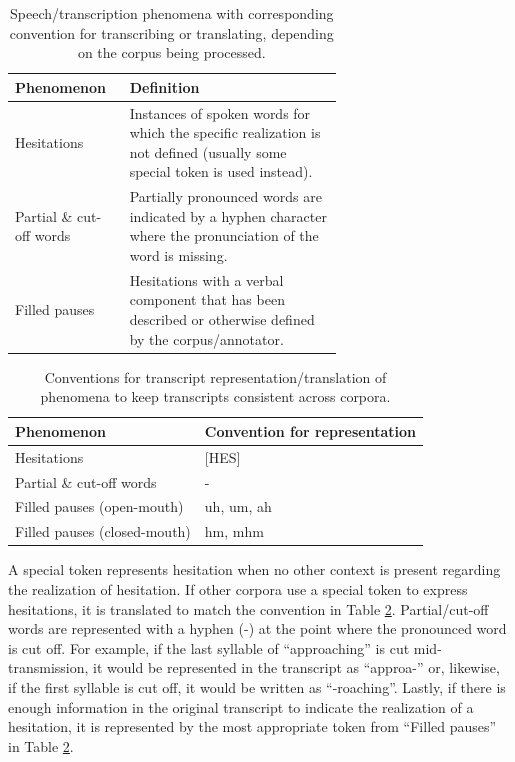 \documentclass[12pt]{article}
\begin{document}
\begin{table}[!t]
    \centering
    \begin{tabular}{l p{0.65\linewidth}}
        \toprule
        Phenomenon               & Definition                                                                                                                \\
        \midrule
        Hesitations              & Instances of spoken words for which the specific realization is not defined (usually some special token is used instead). \\
        \midrule
        Partial \& cut-off words & Partially pronounced words are indicated by a hyphen character where the pronunciation of the word is missing.            \\
        \midrule
        Filled pauses            & Hesitations with a verbal component that has been described or otherwise defined by the corpus/annotator.                 \\
        \bottomrule
    \end{tabular}
    \caption{Speech/transcription phenomena with corresponding convention for transcribing or translating, depending on the corpus being processed.}
    \label{tab:phenomena_definitions}
\end{table}


\begin{table}[!t]
    \centering
    \begin{tabular}{l l}
        \toprule
        Phenomenon                   & Convention for representation \\
        \midrule
        Hesitations                  & [HES]                         \\
        \midrule
        Partial \& cut-off words     & -                             \\
        \midrule
        Filled pauses (open-mouth)   & uh, um, ah                    \\
        \midrule
        Filled pauses (closed-mouth) & hm, mhm                       \\
        \bottomrule
    \end{tabular}
    \caption{Conventions for transcript representation/translation of phenomena to keep transcripts consistent across corpora.}
    \label{tab:phenomena_conventions}
\end{table}

A special token represents hesitation when no other context is present regarding the realization of hesitation. If other corpora use a special token
to express hesitations, it is translated to match the convention in Table \ref{tab:phenomena_conventions}. Partial/cut-off words are represented with
a hyphen (-) at the point where the pronounced word is cut off. For example, if the last syllable of ``approaching'' is cut mid-transmission, it would
be represented in the transcript as ``approa-'' or, likewise, if the first syllable is cut off, it would be written as ``-roaching''. Lastly, if there
is enough information in the original transcript to indicate the realization of a hesitation, it is represented by the most appropriate token from
``Filled pauses'' in Table \ref{tab:phenomena_conventions}.
\end{document}

